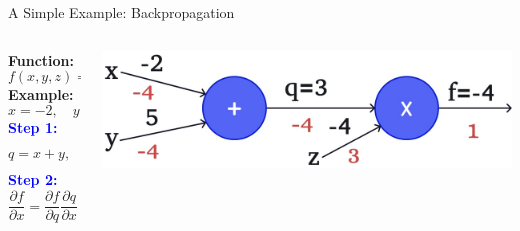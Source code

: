 \documentclass[serif, aspectratio=169]{beamer}
\begin{document}
\begin{frame}{A Simple Example: Backpropagation}

    \begin{columns}
       
        \begin{column}{0.3\textwidth}
            \vspace{-0.4cm}
            \textbf{Function:} 
            \[
            f(x, y, z) = (x + y)z
            \]
            \textbf{Example:} 
            \[
            x = -2, \quad y = 5, \quad z = -4
            \]
            \vspace{-0.4cm}
            \textcolor{blue}{\textbf{Step 1:}}
            \[
             q = x + y, \quad
            \frac{\partial q}{\partial x} = 1, \quad \frac{\partial q}{\partial y} = 1
            \]
            \vspace{-0.2cm}
            \textcolor{blue}{\textbf{Step 2:}}
            \[
            \frac{\partial f}{\partial x} =  \frac{\partial f}{\partial q}
            \frac{\partial q}{\partial x} = -4 \cdot 1 = -4
            \]
        \end{column}

        \begin{column}{0.7\textwidth}
                    \begin{center}
                \includegraphics[width=\textwidth, keepaspectratio]{pic/b8.jpg}
            \end{center}
            
        \end{column}

    \end{columns}

\end{frame}
\end{document}
